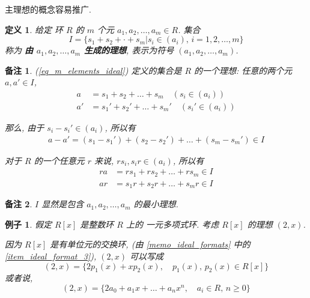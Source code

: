 \documentclass[utf8]{ctexbook}
\newtheorem{definition}{定义}[section]
\newtheorem{memo}{备注}[section]
\newtheorem{example}{例子}[section]
\begin{document}
主理想的概念容易推广.

\begin{definition}
给定 环 $R$ 的 $m$ 个元 $a_1, a_2, \ldots, a_m \in R$. 集合
\begin{equation}
I = \{ s_1 + s_2 + \cdot + s_m | s_i \in (a_i) ,\, i = 1, 2, \ldots, m \} \label{eq_m_elements_ideal}
\end{equation}
称为 \textbf{由 $a_1, a_2, \ldots, a_m$ 生成的理想}, 表示为符号 $(a_1, a_2, \ldots, a_m)$.
\end{definition}

\begin{memo}
(\ref{eq_m_elements_ideal}) 定义的集合是 $R$ 的一个理想:
任意的两个元 $a, a' \in I$,
\begin{align*}
a &= s_1 + s_2 + \ldots + s_m \quad (s_i \in (a_i)) \\
a' &= s_1 ' + s_2 ' + \ldots + s_m ' \quad (s_i ' \in (a_i) )
\end{align*}

那么, 由于 $s_i - s_i ' \in (a_i)$, 所以有
\begin{align*}
a-a' = (s_1 - s_1 ') + (s_2 - s_2 ') + \ldots + (s_m - s_m ') \in I
\end{align*}

对于 $R$ 的一个任意元 $r$ 来说, $rs_i, s_i r \in (a_i)$, 所以有
\begin{align*}
ra &= r s_1 + r s_2 + \ldots + r s_m \in I \\
ar &= s_1 r + s_2 r + \ldots + s_m r \in I
\end{align*}

\end{memo}

\begin{memo}
$I$ 显然是包含 $a_1, a_2, \ldots, a_m$ 的最小理想.
\end{memo}

\begin{example}\label{example_R_polynomial_not_principle_ideal}
假定 $R[x]$ 是整数环 $R$ 上的 一元多项式环. 考虑 $R[x]$ 的理想 $(2, x)$.

因为 $R[x]$ 是有单位元的交换环, (由 \ref{memo_ideal_formats} 中的 \ref{item_ideal_format_3}), $(2, x)$ 可以写成
\begin{equation}
(2, x) = \{ 2 p_1 (x) + x p_2 (x) , \quad p_1 (x), \, p_2 (x) \in R[x] \}
\end{equation}
或者说,
\begin{equation}
(2, x) = \{ 2 a_0 + a_1 x + \ldots + a_n x^n  , \quad a_i \in R, \, n \geq 0 \}
\end{equation}

\end{example}
\end{document}
